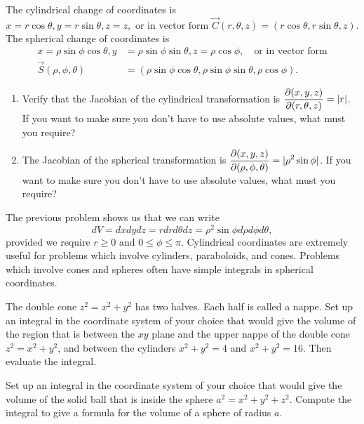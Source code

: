 \begin{problem}
 The cylindrical change of coordinates is 
$$x=r\cos\theta,y=r\sin\theta, z=z, \text{ or in vector form } \vec C(r,\theta,z) = (r\cos\theta,r\sin\theta, z).$$  
The spherical change of coordinates is 
\begin{align*}
x=\rho\sin\phi\cos\theta,y&=\rho\sin\phi\sin\theta, z=\rho\cos\phi, \quad \text{or in vector form}\\
\vec S(\rho,\phi,\theta) &= (\rho\sin\phi\cos\theta,\rho\sin\phi\sin\theta,\rho\cos\phi). 
\end{align*}
\begin{enumerate}
 \item Verify that the Jacobian of the cylindrical transformation is $\displaystyle\frac{\partial(x,y,z)}{\partial(r,\theta,z)} = |r|$.  If you want to make sure you don't have to use absolute values, what must you require?
 \item The Jacobian of the spherical transformation is $\displaystyle\frac{\partial(x,y,z)}{\partial(\rho,\phi,\theta)} = |\rho^2\sin\phi|$.  If you want to make sure you don't have to use absolute values, what must you require?
\end{enumerate}
\end{problem}

The previous problem shows us that we can write
$$dV=dxdydz = rdrd\theta dz = \rho^2\sin\phi d\rho d\phi d\theta,$$
provided we require $r\geq0$ and $0\leq \phi\leq \pi$. 
Cylindrical coordinates are extremely useful for problems which involve cylinders, paraboloids, and cones. 
Problems which involve cones and spheres often have simple integrals in spherical coordinates.

\begin{problem}%
 The double cone $z^2=x^2+y^2$ has two halves.  Each half is called a nappe. Set up an integral in the coordinate system of your choice that would give the volume of the region that is between the $xy$ plane and the upper nappe of the double cone $z^2=x^2+y^2$, and between the cylinders $x^2+y^2=4$ and $x^2+y^2=16$.  Then evaluate the integral.
\end{problem}

\begin{problem}
 Set up an integral in the coordinate system of your choice that would give the volume of the solid ball that is inside the sphere $a^2=x^2+y^2+z^2$. Compute the integral to give a formula for the volume of a sphere of radius $a$.  
\end{problem}


